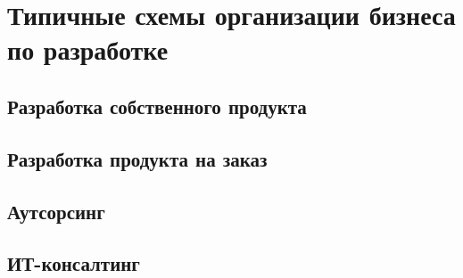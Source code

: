 \documentclass{../industrial-development}
\begin{document}
\section{Типичные схемы организации бизнеса по разработке}

\subsection{Разработка собственного продукта}

\subsection{Разработка продукта на заказ}

\subsection{Аутсорсинг}

\subsection{ИТ-консалтинг}


%  


\end{document}

